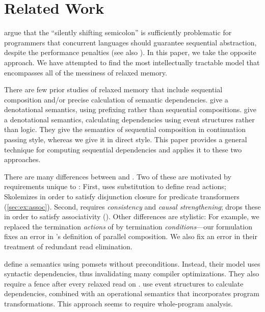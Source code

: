 \section{Related Work}
\label{sec:related}

\citet{DBLP:conf/snapl/MarinoMMNS15} argue that the ``silently shifting
semicolon'' is sufficiently problematic for programmers that concurrent
languages should guarantee sequential abstraction, despite the performance
penalties (see also \citet{10.1145/3462206}).  In this paper, we take the
opposite approach.  We have attempted to find the most intellectually
tractable model that encompasses all of the messiness of relaxed memory.

There are few prior studies of relaxed memory that include sequential
composition and/or precise calculation of semantic dependencies.
\citet{DBLP:journals/pacmpl/JagadeesanJR20} give a denotational semantics,
using prefixing rather than sequential compositions.
\citet{DBLP:conf/esop/PaviottiCPWOB20} give a denotational semantics,
calculating dependencies using event structures rather than logic.  They give
the semantics of sequential composition in continuation passing style,
whereas we give it in direct style.  This paper provides a general technique
for computing sequential dependencies and applies it to these two approaches.

There are many differences between \PwP{}
\cite{DBLP:journals/pacmpl/JagadeesanJR20} and \PwT{}.  Two of these are
motivated by requirements unique to \PwT{}: First, \PwP{} uses substitution
to define read actions; \PwT{} Skolemizes in order to satisfy disjunction
closure for predicate transformers (\textsection\ref{sec:ex:assoc}).  Second,
\PwP{} requires \emph{consistency} and \emph{causal strengthening}; \PwT{}
drops these in order to satisfy associativity ().  Other
differences are stylistic: For example, we replaced the termination
\emph{actions} of \PwP{} by termination \emph{conditions}---our formulation
fixes an error in \citeauthor{DBLP:journals/pacmpl/JagadeesanJR20}'s
definition of parallel composition.  We also fix an error in their treatment
of redundant read elimination.

\citet{DBLP:journals/corr/abs-1804-04214} define a semantics
using pomsets without preconditions. Instead, their model uses syntactic
dependencies, thus invalidating many compiler optimizations.  They also
require a fence after every relaxed read on \armeight{}.
%
\citet{Pichon-Pharabod:2016:CSR:2837614.2837616} use event structures to
calculate dependencies, combined with an operational semantics that
incorporates program transformations.  This approach seems to require
whole-program analysis.




